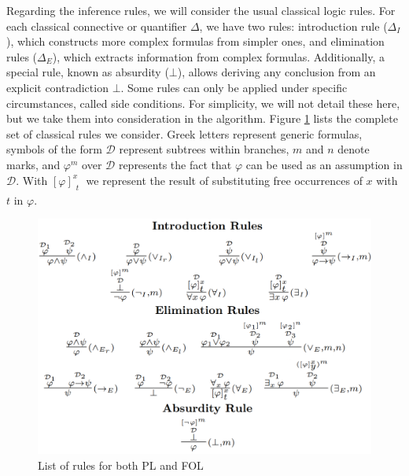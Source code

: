 Regarding the inference rules, we will consider the usual classical logic rules. For each classical connective or quantifier $\Delta$, we have two rules: introduction rule ($\Delta_I$), which constructs more complex formulas from simpler ones, and elimination rules ($\Delta_E$), which extracts information from complex formulas. Additionally, a special rule, known as absurdity (\(\bot\)), allows deriving any conclusion from an explicit contradiction $\bot$. Some rules can only be applied under specific circumstances, called side conditions. For simplicity, we will not detail these here, but we take them into consideration in the algorithm. Figure \ref{fig:nd-rules} lists the complete set of classical rules we consider. Greek letters represent generic formulas, symbols of the form \( \mathcal{D} \) represent subtrees within branches, \( m \) and \( n \) denote marks, and \(\displaystyle \varphi^m\) over \( \mathcal{D} \) represents the fact that $\varphi$ can be used as an assumption in \( \mathcal{D} \).
With \(\displaystyle \left[ \varphi \right]^x_{\substack{t}}\) we represent the result of substituting free occurrences of $x$ with $t$ in $\varphi$.


\begin{figure}[h]
    \centering
    \includegraphics[width=1\linewidth]{resources/rules.png}
    \caption{List of rules for both PL and FOL}
    \label{fig:nd-rules}
\end{figure}


